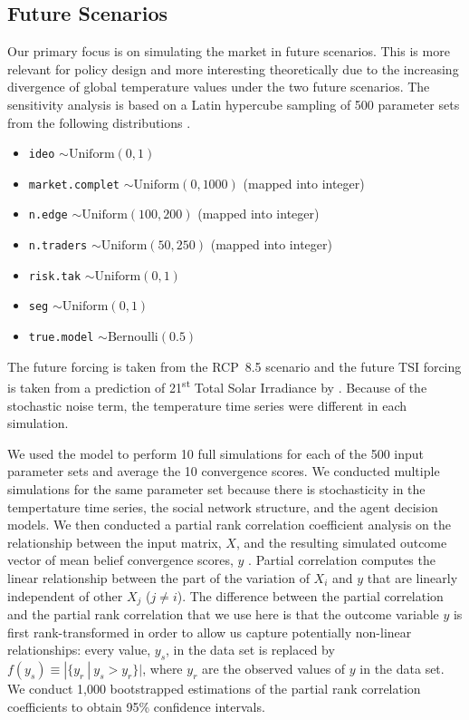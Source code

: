 \documentclass{article}\usepackage[]{graphicx}\usepackage[]{color}
\begin{document}
\subsection{Future Scenarios}



Our primary focus is on simulating the market in future scenarios. This is more relevant for policy design and more interesting theoretically due to the increasing divergence of global temperature values under the two future scenarios. The sensitivity analysis is based on a Latin hypercube sampling of 500 parameter sets from the following distributions .

\begin{itemize}
  \item \texttt{ideo} $\sim \text{Uniform}(0,1)$
  \item \texttt{market.complet} $\sim \text{Uniform}(0,1000)$ (mapped into integer)
  \item \texttt{n.edge} $\sim \text{Uniform}(100,200)$ (mapped into integer)
  \item \texttt{n.traders} $\sim \text{Uniform}(50,250)$ (mapped into integer)
  \item \texttt{risk.tak}  $\sim \text{Uniform}(0,1)$
  \item \texttt{seg} $\sim \text{Uniform}(0,1)$
  \item \texttt{true.model} $\sim \text{Bernoulli}(0.5)$
\end{itemize}

The future  forcing is taken from the RCP~8.5 scenario  and the future TSI forcing is taken from a prediction of 21\textsuperscript{st} Total Solar Irradiance by . Because of the stochastic noise term, the temperature time series were different in each simulation.

We used the model to perform 10 full simulations for each of the 500 input parameter sets and average the 10 convergence scores. We conducted multiple simulations for the same parameter set because there is stochasticity in the tempertature time series, the social network structure, and the agent decision models. We then conducted a partial rank correlation coefficient analysis on the relationship between the input matrix, $X$, and the resulting simulated outcome vector of mean belief convergence scores, $y$ . Partial correlation computes the linear relationship between the part of the variation of $X_i$ and $y$ that are linearly independent of other $X_j$  ($j \neq i$).  The difference between the partial correlation and the partial rank correlation that we use here is that the outcome variable $y$ is first rank-transformed in order to allow us capture potentially non-linear relationships: every value, $y_s$, in the data set is replaced by $f(y_s) \equiv |\{y_r~|~ y_s > y_r\}|$, 
where $y_r$ are the observed values of $y$ in the data set. We conduct 1,000 bootstrapped estimations of the partial rank correlation coefficients to obtain 95\% confidence intervals.
\end{document}
